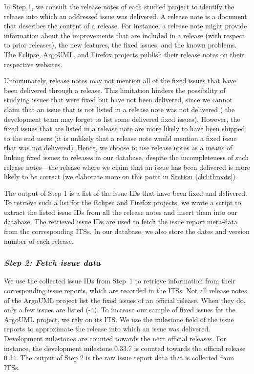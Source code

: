 In Step 1, we consult the release notes of each studied project to identify the
release into which an addressed issue was delivered. A release note is a
document that describes the content of a release. For instance, a release note
might provide information about the improvements that are included in a release (with
respect to prior releases), the new features, the fixed issues, and the known
problems. The Eclipse, ArgoUML, and Firefox projects publish their release notes on their
respective websites.

Unfortunately, release notes may not mention all of the fixed issues that have
been delivered through a release. This limitation hinders the possibility of
studying issues that were fixed but have not been delivered, since we cannot
claim that an issue that is not listed in a release note was not delivered (\eg
the development team may forget to list some delivered fixed issues). However,
the fixed issues that are listed in a release note are more likely to have been
shipped to the end users (\ie it is unlikely that a release note would mention a fixed
issue that was not delivered). Hence, we choose to use release notes as a means
of linking fixed issues to releases in our database, despite the incompleteness
of such release notes---the release where we claim that an issue has been
delivered is more likely to be correct (we elaborate more on this point in
\hyperref[ch4:threats]{Section}~\ref{ch4:threats}).

The output of Step 1 is a list of the issue IDs that have been fixed and
delivered. To retrieve such a list for the Eclipse and Firefox projects, we
wrote a script to extract the listed issue IDs from all the release notes and
insert them into our database. The retrieved issue IDs are used to fetch the
issue report meta-data from the corresponding ITSs. In our database, we also
store the dates and version number of each release. 

\subsubsection*{\textbf{\textit{Step 2: Fetch issue data}}}

We use the collected issue IDs from Step~1 to retrieve information from their corresponding
issue reports, which
are recorded in the ITSs. Not all release notes of
the ArgoUML project
list the fixed issues of an official release. When they do,
only a few issues are listed (-4).
To increase our sample of fixed issues for the ArgoUML project, we rely on its
ITS. We use the milestone field of
the issue reports to approximate the release into which an issue was delivered.
Development milestones are counted towards the next official releases. For
instance, the development milestone
0.33.7
is counted towards the official release 0.34. The output of Step 2 is the raw
issue report data that is collected from ITSs.

